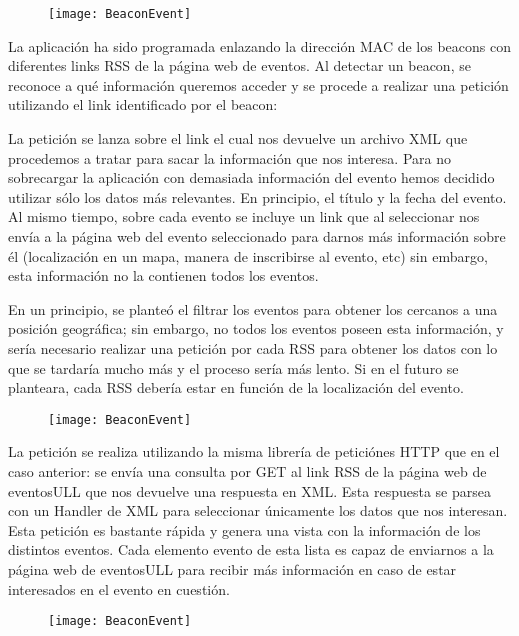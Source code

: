 \begin{figure}[H]
	\centering
	\texttt{[image: BeaconEvent]}
	\label{fig:eventBeacon}
\end{figure}


La aplicación ha sido programada enlazando la dirección MAC de los beacons con diferentes links RSS de la página web de eventos. Al detectar un beacon, se reconoce a qué información queremos acceder y se procede a realizar una petición utilizando el link identificado por el beacon: 


La petición se lanza sobre el link el cual nos devuelve un archivo XML que procedemos a tratar para sacar la información que nos interesa. Para no sobrecargar la aplicación con demasiada información del evento hemos decidido utilizar sólo los datos más relevantes. En principio, el título y la fecha del evento. Al mismo tiempo, sobre cada evento se incluye un link que al seleccionar nos envía a la página web del evento seleccionado para darnos más información sobre él (localización en un mapa, manera de inscribirse al evento, etc) sin embargo, esta información no la contienen todos los eventos.


En un principio, se planteó el filtrar los eventos para obtener los cercanos a una posición geográfica; sin embargo, no todos los eventos poseen esta información, y sería necesario realizar una petición por cada RSS para obtener los datos con lo que se tardaría mucho más y el proceso sería más lento. Si en el futuro se planteara, cada RSS debería estar en función de la localización del evento.

\begin{figure}[H]
	\centering
	\texttt{[image: BeaconEvent]}
	\label{fig:eventBeacon}
\end{figure}


La petición se realiza utilizando la misma librería de peticiónes HTTP que en el caso anterior: se envía una consulta por GET al link RSS de la página web de eventosULL que nos devuelve una respuesta en XML. Esta respuesta se parsea con un Handler de XML para seleccionar únicamente los datos que nos interesan. Esta petición es bastante rápida y genera una vista con la información de los distintos eventos. Cada elemento evento de esta lista es capaz de enviarnos a la página web de eventosULL para recibir más información en caso de estar interesados en el evento en cuestión.

\begin{figure}[H]
	\centering
	\texttt{[image: BeaconEvent]}
	\label{fig:eventBeacon}
\end{figure}

